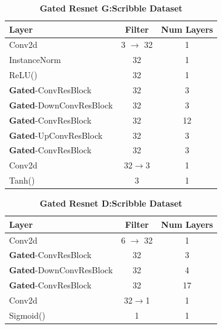 \begin{table}[ht]
\caption{\textbf{Gated Resnet G:Scribble Dataset}}
\centering %
\begin{tabular}{l c c} %
\toprule%
\textbf{Layer} & \textbf{Filter} & \textbf{Num Layers} \\
\midrule
Conv2d & 3 $\rightarrow$ 32 & 1\\
InstanceNorm & 32 & 1 \\ %
ReLU() & 32 & 1\\
\hdashline%
\textbf{Gated}-ConvResBlock & 32 & 3\\
\textbf{Gated}-DownConvResBlock & 32 & 3\\
\textbf{Gated}-ConvResBlock & 32 & 12\\
\textbf{Gated}-UpConvResBlock & 32 & 3\\
\textbf{Gated}-ConvResBlock & 32 & 3\\
\hdashline
Conv2d & 32$\rightarrow$3 & 1 \\
Tanh() & 3 & 1 \\
\bottomrule%
\end{tabular}
\label{table:resnet_g_scribble} %
\end{table}

\begin{table}[ht]
\caption{\textbf{Gated Resnet D:Scribble Dataset}}
\centering %
\begin{tabular}{l c c} %
\toprule%
\textbf{Layer} & \textbf{Filter} & \textbf{Num Layers} \\
\midrule
Conv2d & 6 $\rightarrow$ 32 & 1\\
\hdashline%
\textbf{Gated}-ConvResBlock & 32 & 3\\
\textbf{Gated}-DownConvResBlock & 32 & 4\\
\textbf{Gated}-ConvResBlock & 32 & 17\\
\hdashline
Conv2d & 32$\rightarrow$1 & 1 \\
Sigmoid() & 1 & 1 \\
\bottomrule%
\end{tabular}
\label{table:resnet_d_scribble} %
\end{table}


